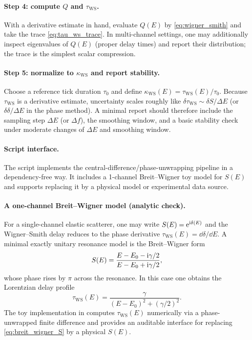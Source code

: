 \paragraph{Step 4: compute \texorpdfstring{$Q$}{Q} and \texorpdfstring{$\tau_{\mathrm{WS}}$}{tau_WS}.}
With a derivative estimate in hand, evaluate $Q(E)$ by \eqref{eq:wigner_smith} and take the trace \eqref{eq:tau_ws_trace}.
In multi-channel settings, one may additionally inspect eigenvalues of $Q(E)$ (proper delay times) and report their distribution; the trace is the simplest scalar compression.

\paragraph{Step 5: normalize to \texorpdfstring{$\kappa_{\mathrm{WS}}$}{kappaWS} and report stability.}
Choose a reference tick duration $\tau_0$ and define $\kappa_{\mathrm{WS}}(E)=\tau_{\mathrm{WS}}(E)/\tau_0$.
Because $\tau_{\mathrm{WS}}$ is a derivative estimate, uncertainty scales roughly like $\delta\tau_{\mathrm{WS}}\sim \delta S/\Delta E$ (or $\delta\delta/\Delta E$ in the phase method).
A minimal report should therefore include the sampling step $\Delta E$ (or $\Delta f$), the smoothing window, and a basic stability check under moderate changes of $\Delta E$ and smoothing window.

\paragraph{Script interface.}
The script  implements the central-difference/phase-unwrapping pipeline in a dependency-free way.
It includes a 1-channel Breit--Wigner toy model for $S(E)$ and supports replacing it by a physical model or experimental data source.

\paragraph{A one-channel Breit--Wigner model (analytic check).}
For a single-channel elastic scatterer, one may write $S(E)=\mathrm{e}^{\mathrm{i}\delta(E)}$ and the Wigner--Smith delay reduces to the phase derivative $\tau_{\mathrm{WS}}(E)=\dd\delta/\dd E$.
A minimal exactly unitary resonance model is the Breit--Wigner form
\begin{equation}
\label{eq:breit_wigner_S}
S(E)=\frac{E-E_0-\mathrm{i}\gamma/2}{E-E_0+\mathrm{i}\gamma/2},
\end{equation}
whose phase rises by $\pi$ across the resonance.
In this case one obtains the Lorentzian delay profile
\begin{equation}
\label{eq:breit_wigner_tau}
\tau_{\mathrm{WS}}(E)=\frac{\gamma}{(E-E_0)^2+(\gamma/2)^2}.
\end{equation}
The toy implementation in  computes $\tau_{\mathrm{WS}}(E)$ numerically via a phase-unwrapped finite difference and provides an auditable interface for replacing \eqref{eq:breit_wigner_S} by a physical $S(E)$.

